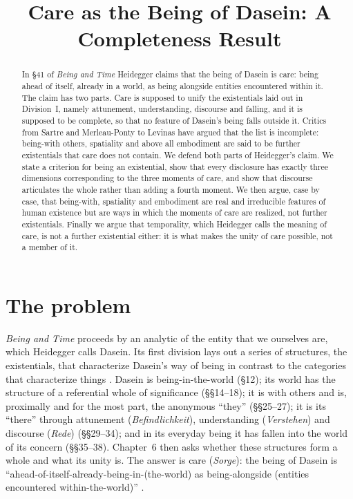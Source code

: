 \documentclass{situationist-preprint}
\title{Care as the Being of Dasein: A Completeness Result}
\begin{document}
\maketitle

\begin{abstract}
In \S41 of \emph{Being and Time} Heidegger claims that the being of Dasein is care: being ahead of itself, already in a world, as being alongside entities encountered within it. The claim has two parts. Care is supposed to unify the existentials laid out in Division~I, namely attunement, understanding, discourse and falling, and it is supposed to be complete, so that no feature of Dasein's being falls outside it. Critics from Sartre and Merleau-Ponty to Levinas have argued that the list is incomplete: being-with others, spatiality and above all embodiment are said to be further existentials that care does not contain. We defend both parts of Heidegger's claim. We state a criterion for being an existential, show that every disclosure has exactly three dimensions corresponding to the three moments of care, and show that discourse articulates the whole rather than adding a fourth moment. We then argue, case by case, that being-with, spatiality and embodiment are real and irreducible features of human existence but are ways in which the moments of care are realized, not further existentials. Finally we argue that temporality, which Heidegger calls the meaning of care, is not a further existential either: it is what makes the unity of care possible, not a member of it.
\end{abstract}

\section{The problem}

\emph{Being and Time} proceeds by an analytic of the entity that we ourselves are, which Heidegger calls Dasein. Its first division lays out a series of structures, the existentials, that characterize Dasein's way of being in contrast to the categories that characterize things \citep[\S9]{Heidegger1927}. Dasein is being-in-the-world (\S12); its world has the structure of a referential whole of significance (\S\S14--18); it is with others and is, proximally and for the most part, the anonymous \enquote{they} (\S\S25--27); it is its \enquote{there} through attunement (\emph{Befindlichkeit}), understanding (\emph{Verstehen}) and discourse (\emph{Rede}) (\S\S29--34); and in its everyday being it has fallen into the world of its concern (\S\S35--38). Chapter~6 then asks whether these structures form a whole and what its unity is. The answer is care (\emph{Sorge}): the being of Dasein is \enquote{ahead-of-itself-already-being-in-(the-world) as being-alongside (entities encountered within-the-world)} \citep[\S41]{Heidegger1927}.
\end{document}
